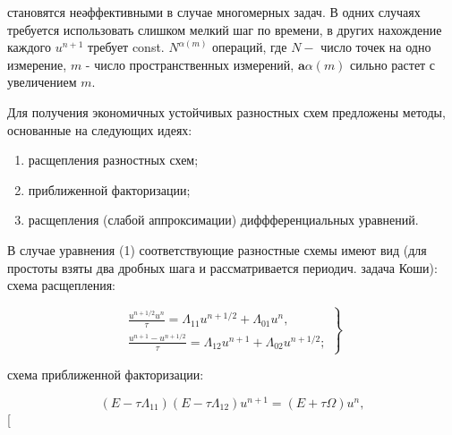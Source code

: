 \documentclass[10pt]{article}
\begin{document}
становятся неәффективными в случае многомерных задач. В одних случаях требуется использовать слишком мелкий шаг по времени, в других нахождение каждого $u^{n+1}$ требует const. $N^{\alpha(m)}$ операций, где $N-$ число точек на одно измерение, $m$ - число пространственных измерений, $\mathbf{a} \alpha(m)$ сильно растет с увеличением $m$.



Для получения экономичных устойчивых разностных схем предложены методы, основанные на следующих идеях:



\begin{enumerate}

  \item расщепления разностных схем;



  \item приближенной факторизации;



  \item расщепления (слабой аппроксимации) диффференциальных уравнений.



\end{enumerate}



В случае уравнения (1) соответствующие разностные схемы имеют вид (для простоты взяты два дробных шага и рассматривается периодич. задача Коши): схема расщепления:



\[

\left.\begin{array}{l}

\frac{u^{n+1 / 2} u^{n}}{\tau}=\Lambda_{11} u^{n+1 / 2}+\Lambda_{01} u^{n}, \\

\frac{u^{n+1}-u^{n+1 / 2}}{\tau}=\Lambda_{12} u^{n+1}+\Lambda_{02} u^{n+1 / 2} ;

\end{array}\right\}

\]



схема приближенной факторизации:



\[

\left(E-\tau \Lambda_{11}\right)\left(E-\tau \Lambda_{12}\right) u^{n+1}=(E+\tau \Omega) u^{n},

\][
\end{document}
